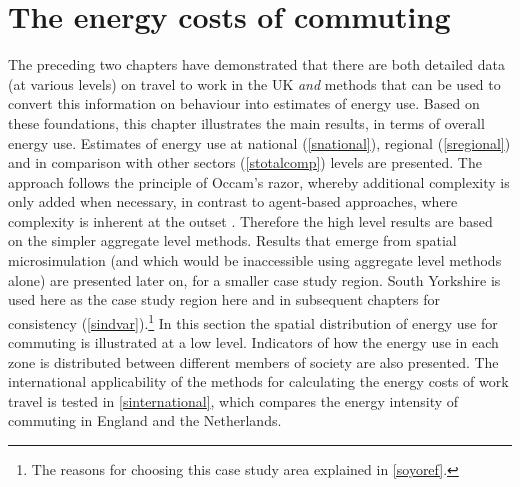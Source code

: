 
\chapter{The energy costs of commuting}
\label{Chapter6}
\fancyhead[RE,LO]{\thepage}
The preceding two chapters have demonstrated that there are both detailed
data (at various levels) on travel to work in the UK \emph{and} methods
that can be used to convert this information on behaviour
into estimates of energy use. Based
on these foundations, this chapter illustrates the main results, in terms
of overall energy use. 
Estimates of
energy use at national (\cref{snational}), regional (\cref{sregional}) and
in comparison with other sectors (\cref{stotalcomp}) levels are presented.
The approach follows the
principle of Occam's razor, whereby additional complexity is only added when
necessary, in contrast to agent-based approaches, where complexity is inherent at the
outset \citep{batty2012perspectives}.
Therefore the high level results are based on the simpler
aggregate level methods. Results that emerge from spatial microsimulation
(and which would be inaccessible using aggregate level methods alone) are presented
later on, for a smaller case study region. South Yorkshire is used here
as the case study region here and in subsequent chapters for consistency
(\cref{sindvar}).\footnote{The
reasons for choosing this case study area explained in \cref{soyoref}.
}
In this section the spatial distribution of energy use for commuting is
illustrated at a low level. Indicators of how the energy use
in each zone is distributed between different members of society are also
presented.
The international applicability of the
methods for calculating the energy costs of work travel
is tested in \cref{sinternational}, which
compares the energy intensity of commuting in England and the Netherlands.
% 
